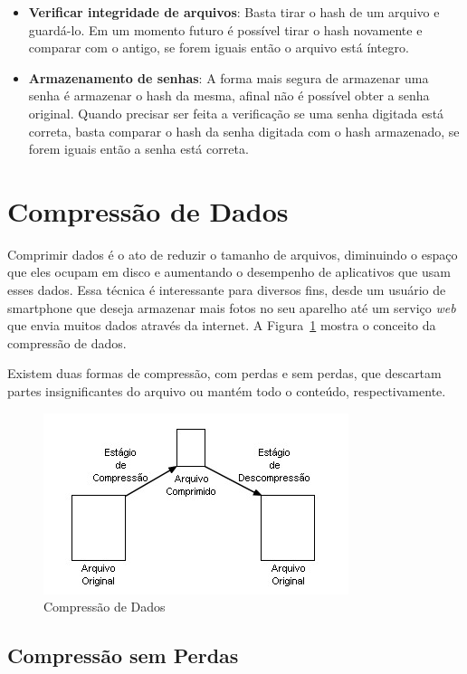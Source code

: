\begin{itemize}
    \item \textbf{Verificar integridade de arquivos}: Basta tirar o hash de um arquivo e guardá-lo. Em um momento futuro é possível tirar o hash novamente e comparar com o antigo, se forem iguais então o arquivo está íntegro.
    \item \textbf{Armazenamento de senhas}: A forma mais segura de armazenar uma senha é armazenar o hash da mesma, afinal não é possível obter a senha original. Quando precisar ser feita a verificação se uma senha digitada está correta, basta comparar o hash da senha digitada com o hash armazenado, se forem iguais então a senha está correta.
\end{itemize}

\section{Compressão de Dados}

Comprimir dados é o ato de reduzir o tamanho de arquivos, diminuindo o espaço que eles ocupam em disco e aumentando o desempenho de aplicativos que usam esses dados. Essa técnica é interessante para diversos fins, desde um usuário de smartphone que deseja armazenar mais fotos no seu aparelho até um serviço \textit{web} que envia muitos dados através da internet. A Figura~\ref{fig:compression} mostra o conceito da compressão de dados.

Existem duas formas de compressão, com perdas e sem perdas, que descartam partes insignificantes do arquivo ou mantém todo o conteúdo, respectivamente.

\begin{figure}[t]
    \centering
    \includegraphics{Images/Compressao.jpg}
    \caption{Compressão de Dados}\label{fig:compression}
\end{figure}

\subsection{Compressão sem Perdas}


